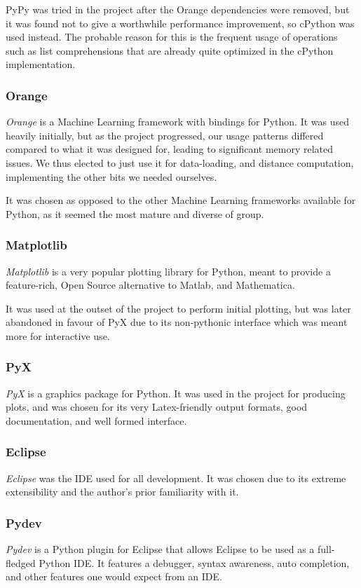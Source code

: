 \documentclass[a4paper,11pt]{report}
\begin{document}
PyPy was tried in the project after the Orange dependencies were removed, but it was found not to give a worthwhile performance improvement, so cPython was used instead. The probable reason for this is the frequent usage of operations such as list comprehensions that are already quite optimized in the cPython implementation.

\subsubsection*{Orange}
\emph{Orange}\cite{prog:orange} is a Machine Learning framework with bindings for Python. It was used heavily initially, but as the project progressed, our usage patterns differed compared to what it was designed for, leading to significant memory related issues. We thus elected to just use it for data-loading, and distance computation, implementing the other bits we needed ourselves.

It was chosen as opposed to the other Machine Learning frameworks available for Python, as it seemed the most mature and diverse of group.

\subsubsection*{Matplotlib}
\emph{Matplotlib}\cite{prog:matplotlib} is a very popular plotting library for Python, meant to provide a feature-rich, Open Source alternative to Matlab, and Mathematica.

It was used at the outset of the project to perform initial plotting, but was later abandoned in favour of PyX due to its non-pythonic interface which was meant more for interactive use.

\subsubsection*{PyX}
\emph{PyX}\cite{prog:pyx} is a graphics package for Python. It was used in the project for producing plots, and was chosen for its very Latex-friendly output formats, good documentation, and well formed interface.

\subsubsection*{Eclipse}
\emph{Eclipse} was the IDE used for all development. It was chosen due to its extreme extensibility and the author's prior familiarity with it.

\subsubsection*{Pydev}
\emph{Pydev}\cite{prog:pydev} is a Python plugin for Eclipse that allows Eclipse to be used as a full-fledged Python IDE. It features a debugger, syntax awareness, auto completion, and other features one would expect from an IDE.
\end{document}
